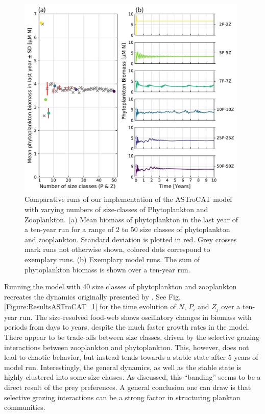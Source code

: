 \documentclass[gmd, manuscript]{copernicus}
\begin{document}
\begin{figure}[t]
\includegraphics[width=11cm]{Figures/firstdraft_plots/03_ASTroCAT_sizeclassrange.pdf}
\caption{Comparative runs of our implementation of the ASTroCAT model with varying numbers of size-classes of Phytoplankton and Zooplankton. (a) Mean biomass of phytoplankton in the last year of a ten-year run for a range of 2 to 50 size classes of phytoplankton and zooplankton. Standard deviation is plotted in red. Grey crosses mark runs not otherwise shown, colored dots correspond to exemplary runs. (b) Exemplary model runs. The sum of phytoplankton biomass is shown over a ten-year run.}
\label{Figure:ResultsASTroCAT_2}
\end{figure}

Running the model with 40 size classes of phytoplankton and zooplankton recreates the dynamics originally presented by \citet{Banas2011b}. See Fig. \ref{Figure:ResultsASTroCAT_1} for the time evolution of $N$, $P_i$ and $Z_j$ over a ten-year run. The size-resolved food-web shows oscillatory changes in biomass with periods from days to years, despite the much faster growth rates in the model. There appear to be trade-offs between size classes, driven by the selective grazing interactions between zooplankton and phytoplankton. This, however, does not lead to chaotic behavior, but instead tends towards a stable state after 5 years of model run. Interestingly, the general dynamics, as well as the stable state is highly clustered into some size classes. As \citet{Banas2011b} discussed, this “banding” seems to be a direct result of the prey preferences. A general conclusion one can draw is that selective grazing interactions can be a strong factor in structuring plankton communities.
\end{document}
